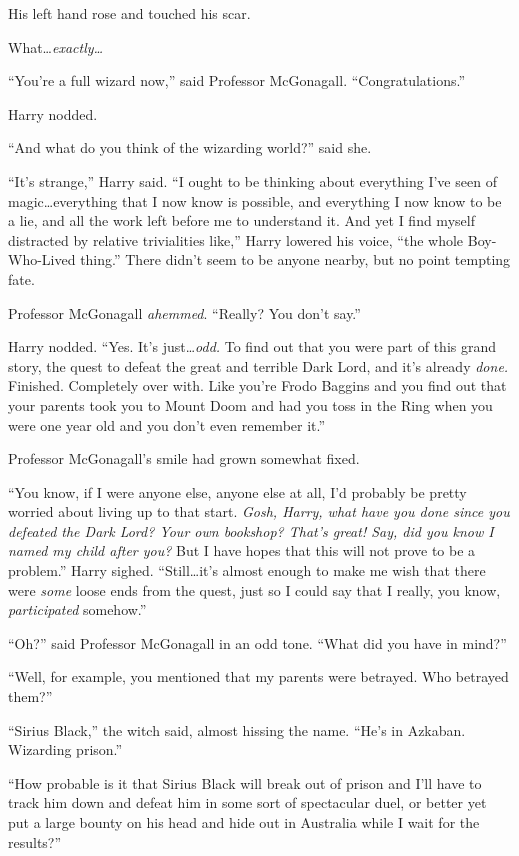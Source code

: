 His left hand rose and touched his scar.

What…\emph{exactly…}

“You’re a full wizard now,” said Professor McGonagall. “Congratulations.”

Harry nodded.

“And what do you think of the wizarding world?” said she.

“It’s strange,” Harry said. “I ought to be thinking about everything I’ve seen of magic…everything that I now know is possible, and everything I now know to be a lie, and all the work left before me to understand it. And yet I find myself distracted by relative trivialities like,” Harry lowered his voice, “the whole Boy-Who-Lived thing.” There didn’t seem to be anyone nearby, but no point tempting fate.

Professor McGonagall \emph{ahemmed}. “Really? You don’t say.”

Harry nodded. “Yes. It’s just…\emph{odd.} To find out that you were part of this grand story, the quest to defeat the great and terrible Dark Lord, and it’s already \emph{done.} Finished. Completely over with. Like you’re Frodo Baggins and you find out that your parents took you to Mount Doom and had you toss in the Ring when you were one year old and you don’t even remember it.”

Professor McGonagall’s smile had grown somewhat fixed.

“You know, if I were anyone else, anyone else at all, I’d probably be pretty worried about living up to that start. \emph{Gosh, Harry, what have you done since you defeated the Dark Lord? Your own bookshop? That’s great! Say, did you know I named my child after you?} But I have hopes that this will not prove to be a problem.” Harry sighed. “Still…it’s almost enough to make me wish that there were \emph{some} loose ends from the quest, just so I could say that I really, you know, \emph{participated} somehow.”

“Oh?” said Professor McGonagall in an odd tone. “What did you have in mind?”

“Well, for example, you mentioned that my parents were betrayed. Who betrayed them?”

“Sirius Black,” the witch said, almost hissing the name. “He’s in Azkaban. Wizarding prison.”

“How probable is it that Sirius Black will break out of prison and I’ll have to track him down and defeat him in some sort of spectacular duel, or better yet put a large bounty on his head and hide out in Australia while I wait for the results?”

